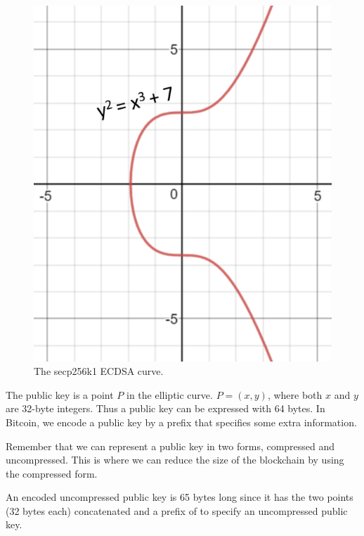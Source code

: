 \begin{figure}[h]
\begin{center}
\includegraphics[scale=0.5]{images/ecdsa-curve}
\caption{The secp256k1 ECDSA curve.}
\label{fig:ecdsa-curve}
\end{center}
\end{figure}

The public key is a point $P$ in the elliptic curve. $P = (x,y)$, where both $x$ and $y$ are 32-byte integers. Thus a public key can be expressed with 64 bytes. In Bitcoin, we encode a public key by a prefix that specifies some extra information.

\begin{note}
Remember that we can represent a public key in two forms, compressed and uncompressed. This is where we can reduce the size of the blockchain by using the compressed form.
\end{note}

An encoded uncompressed public key is 65 bytes long since it has the two points (32 bytes each) concatenated and a prefix of  to specify an uncompressed public key.


